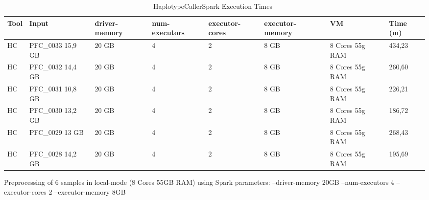 \begin{table}[h]
	\caption{HaplotypeCallerSpark Execution Times~\label{HC_6_8}}
	\begin{center}
		\begin{tabular}{| m{5em} | m{5em} | m{3em} | m{4em} | m{4em} | m{5em} | m{4.5em} | m{3em} |}
    		\hline
    		Tool & Input & driver-memory & num-executors & executor-cores & executor-memory & VM & Time (m) \\ \hline
		    HC & PFC\_0033 15,9 GB & 20 GB & 4 & 2 & 8 GB & 8 Cores 55g RAM & 434,23 \\ \hline
			HC & PFC\_0032 14,4 GB & 20 GB & 4 & 2 & 8 GB & 8 Cores 55g RAM  & 260,60 \\ \hline
			HC & PFC\_0031 10,8 GB & 20 GB & 4 & 2 & 8 GB & 8 Cores 55g RAM  & 226,21 \\ \hline
			HC & PFC\_0030 13,2 GB& 20 GB & 4 & 2 & 8 GB & 8 Cores 55g RAM  & 186,72 \\ \hline
			HC & PFC\_0029 13 GB & 20 GB & 4 & 2 & 8 GB & 8 Cores 55g RAM  & 268,43 \\ \hline
			HC & PFC\_0028 14,2 GB & 20 GB & 4 & 2 & 8 GB & 8 Cores 55g RAM  & 195,69 \\ \hline
    	\end{tabular}
    \end{center}
\end{table}
\begin{chart}[!ht]
\centering
{}
\caption{Preprocessing of 6 samples in local-mode (8 Cores 55GB RAM) using Spark parameters: --driver-memory 20GB --num-executors 4 --executor-cores 2 --executor-memory 8GB}\label{cht:preprocessing8}
\end{chart}




